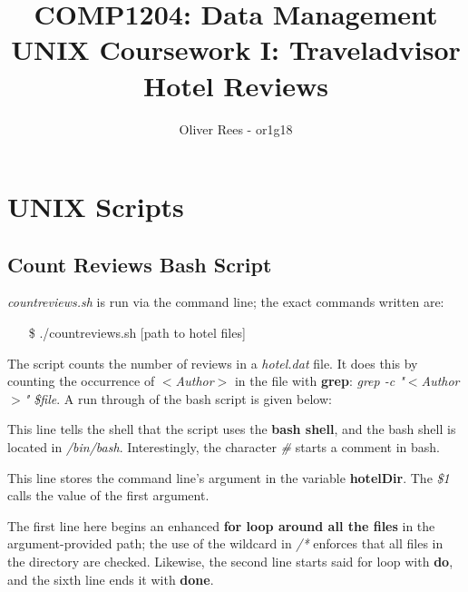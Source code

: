 \documentclass{article}
\title{\textbf{COMP1204}: Data Management \newline \textbf{UNIX Coursework I}: Traveladvisor Hotel Reviews}
\author{Oliver Rees - or1g18}
\begin{document}
	\begin{titlepage}
		\maketitle
	\end{titlepage}
	
	\tableofcontents
	\newpage
	
	\section{UNIX Scripts}
	\subsection{Count Reviews Bash Script} \label{countreviews script}
	\textit{countreviews.sh} is run via the command line; the exact commands written are: 
	
	\begin{itemize}
		\item [\$] ./countreviews.sh [path to hotel files]
	\end{itemize}

	The script counts the number of reviews in a \textit{hotel.dat} file. It does this by counting the occurrence of \textit{$<$Author$>$} in the file with \textbf{grep}: \textit{grep -c "$<$Author$>$" \$file}. A run through of the bash script is given below: 
	
	
	
	
	
	
	This line tells the shell that the script uses the \textbf{bash shell}, and the bash shell is located in \textit{/bin/bash}. Interestingly, the character \textit{\#} starts a comment in bash. 
	
	
	
	
	This line stores the command line's argument in the variable \textbf{hotelDir}. The \textit{\$1} calls the value of the first argument. 
	
	
	
	
	The first line here begins an enhanced \textbf{for loop around all the files} in the argument-provided path; the use of the wildcard in \textit{/*} enforces that all files in the directory are checked. Likewise, the second line starts said for loop with \textbf{do}, and the sixth line ends it with \textbf{done}. 
	
\end{document}
